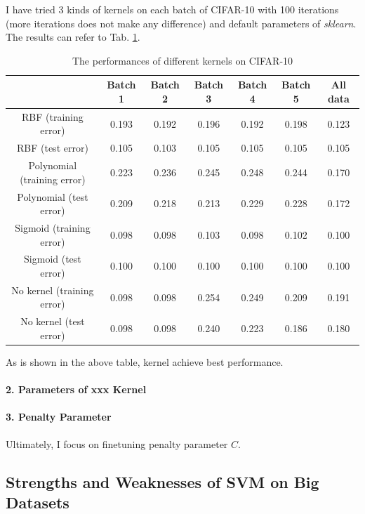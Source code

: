 \documentclass[12pt,a4paper]{article}
\theoremstyle{definition}
\begin{document}
\vspace{0.01\linewidth}
I have tried 3 kinds of kernels on each batch of CIFAR-10 with 100 iterations (more iterations does not make any difference) and default parameters of \textit{sklearn}. The results can refer to Tab. \ref{tab:bonus-kernel}.

\begin{table}[H]
	\renewcommand\arraystretch{1.35}
	\caption{The performances of different kernels on CIFAR-10}
	\label{tab:bonus-kernel}
	\centering
	
	\begin{tabular}{c|c|c|c|c|c|c}
		\centering
		 & Batch 1 & Batch 2 & Batch 3 & Batch 4 & Batch 5 & All data \\
		\hline
		
		RBF (training error) & 0.193 & 0.192 & 0.196 & 0.192 & 0.198 &  0.123 \\
		RBF (test error) & 0.105 & 0.103 & 0.105 & 0.105 & 0.105 & 0.105 \\
		Polynomial (training error) & 0.223 & 0.236 & 0.245 & 0.248 & 0.244 & 0.170 \\
		Polynomial (test error) & 0.209 & 0.218 & 0.213 & 0.229 & 0.228 & 0.172 \\
		Sigmoid (training error) & 0.098 & 0.098 & 0.103 & 0.098 & 0.102 & 0.100 \\
		Sigmoid (test error) & 0.100 & 0.100 & 0.100 & 0.100 & 0.100 & 0.100 \\
		No kernel (training error) & 0.098 & 0.098 & 0.254 & 0.249 & 0.209 & 0.191 \\
		No kernel (test error) & 0.098 & 0.098 & 0.240 & 0.223 & 0.186 & 0.180 \\
	\end{tabular}
\end{table}

As is shown in the above table, kernel achieve best performance.

\paragraph{2. Parameters of xxx Kernel}

\paragraph{3. Penalty Parameter}

Ultimately, I focus on finetuning penalty parameter $C$.

\subsection{Strengths and Weaknesses of SVM on Big Datasets}
\end{document}
